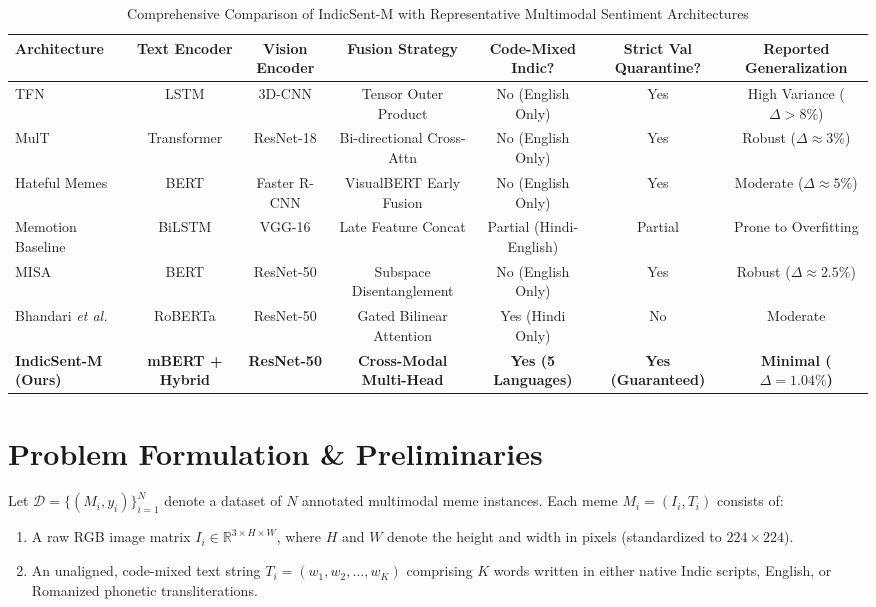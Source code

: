 \documentclass[10pt,journal,compsoc]{IEEEtran}
\begin{document}
\begin{table}[!t]
\centering
\caption{Comprehensive Comparison of IndicSent-M with Representative Multimodal Sentiment Architectures}
\label{tab:related_works_comparison}
\begin{tabular}{lcccccc}
\toprule
\textbf{Architecture} & \textbf{Text Encoder} & \textbf{Vision Encoder} & \textbf{Fusion Strategy} & \textbf{Code-Mixed Indic?} & \textbf{Strict Val Quarantine?} & \textbf{Reported Generalization} \\
\midrule
TFN \cite{zadeh2017tensor} & LSTM & 3D-CNN & Tensor Outer Product & No (English Only) & Yes & High Variance ($\Delta > 8\%$) \\
MulT \cite{tsai2019multimodal} & Transformer & ResNet-18 & Bi-directional Cross-Attn & No (English Only) & Yes & Robust ($\Delta \approx 3\%$) \\
Hateful Memes \cite{kiela2020hateful} & BERT & Faster R-CNN & VisualBERT Early Fusion & No (English Only) & Yes & Moderate ($\Delta \approx 5\%$) \\
Memotion Baseline \cite{sharma2020semeval} & BiLSTM & VGG-16 & Late Feature Concat & Partial (Hindi-English) & Partial & Prone to Overfitting \\
MISA \cite{hazarika2020misa} & BERT & ResNet-50 & Subspace Disentanglement & No (English Only) & Yes & Robust ($\Delta \approx 2.5\%$) \\
Bhandari \textit{et al.} \cite{bhandari2022meme} & RoBERTa & ResNet-50 & Gated Bilinear Attention & Yes (Hindi Only) & No & Moderate \\
\textbf{IndicSent-M (Ours)} & \textbf{mBERT + Hybrid} & \textbf{ResNet-50} & \textbf{Cross-Modal Multi-Head} & \textbf{Yes (5 Languages)} & \textbf{Yes (Guaranteed)} & \textbf{Minimal ($\Delta = 1.04\%$)} \\
\bottomrule
\end{tabular}
\end{table}

\section{Problem Formulation \& Preliminaries}
\label{sec:formulation}

Let $\mathcal{D} = \{(M_i, y_i)\}_{i=1}^{N}$ denote a dataset of $N$ annotated multimodal meme instances. Each meme $M_i = (I_i, T_i)$ consists of:
\begin{enumerate}
    \item A raw RGB image matrix $I_i \in \mathbb{R}^{3 \times H \times W}$, where $H$ and $W$ denote the height and width in pixels (standardized to $224 \times 224$).
    \item An unaligned, code-mixed text string $T_i = (w_1, w_2, \dots, w_K)$ comprising $K$ words written in either native Indic scripts, English, or Romanized phonetic transliterations.
\end{enumerate}
\end{document}
